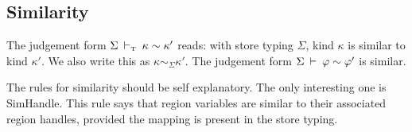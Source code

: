 \clearpage{}
\subsection{Similarity}

\bigskip



The judgement form $\Sigma \: \vdash_\textrm{\tiny{T}} \: \kappa \sim \kappa'$ reads: with store typing $\Sigma$, kind $\kappa$ is similar to kind $\kappa'$. We also write this as $\kappa \sim_{\Sigma} \kappa'$. The judgement form $\Sigma \: \vdash \: \varphi \sim \varphi'$ is similar.

The rules for similarity should be self explanatory. The only interesting one is SimHandle. This rule says that region variables are similar to their associated region handles, provided the mapping is present in the store typing.


